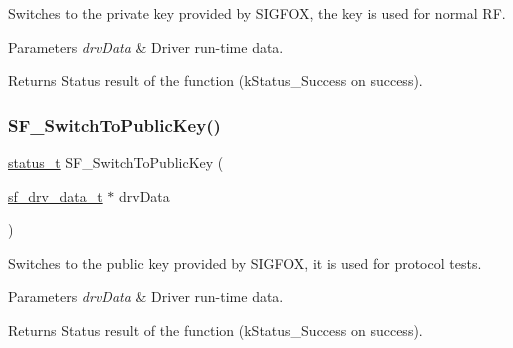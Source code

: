 Switches to the private key provided by S\+I\+G\+F\+OX, the key is used for normal RF. 


\begin{DoxyParams}{Parameters}
{\em drv\+Data} & Driver run-\/time data.\\
\hline
\end{DoxyParams}
\begin{DoxyReturn}{Returns}
Status result of the function (k\+Status\+\_\+\+Success on success). 
\end{DoxyReturn}
\mbox{\label{group__sf__functions__group_gacc6d9bcb60d775ccb2d3739b5d41eb96}} 
\subsubsection{\texorpdfstring{SF\_SwitchToPublicKey()}{SF\_SwitchToPublicKey()}}
{\footnotesize\ttfamily \mbox{\hyperlink{group__ksdk__common_gaaabdaf7ee58ca7269bd4bf24efcde092}{status\+\_\+t}} S\+F\+\_\+\+Switch\+To\+Public\+Key (\begin{DoxyParamCaption}\item[{\mbox{\hyperlink{structsf__drv__data__t}{sf\+\_\+drv\+\_\+data\+\_\+t}} $\ast$}]{drv\+Data }\end{DoxyParamCaption})}



Switches to the public key provided by S\+I\+G\+F\+OX, it is used for protocol tests. 


\begin{DoxyParams}{Parameters}
{\em drv\+Data} & Driver run-\/time data.\\
\hline
\end{DoxyParams}
\begin{DoxyReturn}{Returns}
Status result of the function (k\+Status\+\_\+\+Success on success). 
\end{DoxyReturn}
\mbox{\label{group__sf__functions__group_gafd1dfd2b45bdd9aea388af2cb4466395}} 
